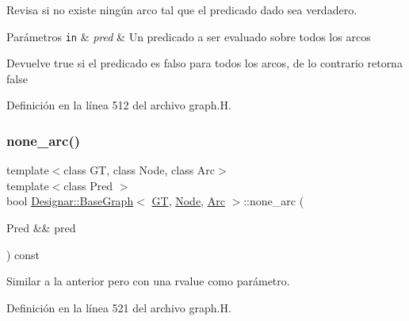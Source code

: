 Revisa si no existe ningún arco tal que el predicado dado sea verdadero. 


\begin{DoxyParams}[1]{Parámetros}
\mbox{\tt in}  & {\em pred} & Un predicado a ser evaluado sobre todos los arcos \\
\hline
\end{DoxyParams}
\begin{DoxyReturn}{Devuelve}
{\ttfamily true} si el predicado es falso para todos los arcos, de lo contrario retorna {\ttfamily false} 
\end{DoxyReturn}


Definición en la línea 512 del archivo graph.\+H.

\mbox{\label{class_designar_1_1_base_graph_a69c4841b8c517a510d738bc1204da7b7}} 
\subsubsection{\texorpdfstring{none\+\_\+arc()}{none\_arc()}\hspace{0.1cm}{\footnotesize\ttfamily [2/2]}}
{\footnotesize\ttfamily template$<$class GT, class Node, class Arc$>$ \\
template$<$class Pred $>$ \\
bool \hyperlink{class_designar_1_1_base_graph}{Designar\+::\+Base\+Graph}$<$ \hyperlink{demo-buildgraph_8_c_a3001c40d2c31ca87ed96cd7d1334a55e}{GT}, \hyperlink{namespace_designar_a5af326c65aa2bd26b26c410f2030d09e}{Node}, \hyperlink{namespace_designar_a3f55fb5513d62ff47cbc8f72b8e95d6f}{Arc} $>$\+::none\+\_\+arc (\begin{DoxyParamCaption}\item[{Pred \&\&}]{pred }\end{DoxyParamCaption}) const\hspace{0.3cm}{\ttfamily [inline]}}



Similar a la anterior pero con una rvalue como parámetro. 



Definición en la línea 521 del archivo graph.\+H.

\mbox{\label{class_designar_1_1_base_graph_aa87c903e7fbf82a30edc9e442a115050}} 
